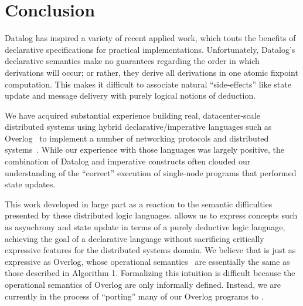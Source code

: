 \section{Conclusion}



Datalog has inspired a variety of recent applied work, which touts the benefits of declarative specifications for practical implementations.  Unfortunately, Datalog's declarative semantics make no guarantees
regarding the order in which derivations will occur; or rather, they derive all derivations in one atomic fixpoint computation.  This makes it difficult to associate natural ``side-effects'' like state update and message delivery with purely logical notions of deduction.


We have acquired substantial experience building real, datacenter-scale
distributed systems using hybrid
declarative/imperative languages such as Overlog~\cite{Loo2009-CACM}
to implement a number of networking protocols and distributed
systems~\cite{boom-techr,Alvaro2009I-Do-Declare:-C,Chu:2007,Loo2009-CACM}.
While our experience with those languages was largely positive, the 
combination of Datalog and imperative constructs 
often clouded  our understanding of the
``correct'' execution of single-node programs that performed state
updates.  

This work developed in large part as a reaction to the semantic difficulties
presented by these distributed logic languages.  
\lang allows us to express concepts such as asynchrony and state update in terms of a purely deductive logic
language, achieving the goal of a declarative language without sacrificing critically expressive features for the distributed systems domain.
We believe that \lang is just as expressive as Overlog, whose operational semantics~\cite{boom-techr} are essentially the same
as those described in Algorithm 1.  Formalizing this intuition is difficult because the operational semantics of Overlog are only informally
defined.  Instead, we are currently in the process of ``porting'' many of our Overlog programs to \lang.



